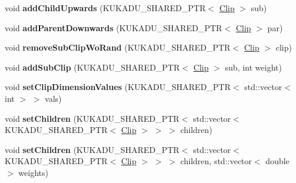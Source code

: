 \begin{DoxyCompactItemize}
\item 
void {\bfseries add\+Child\+Upwards} (K\+U\+K\+A\+D\+U\+\_\+\+S\+H\+A\+R\+E\+D\+\_\+\+P\+TR$<$ \hyperlink{classkukadu_1_1Clip}{Clip} $>$ sub)\hypertarget{classkukadu_1_1Clip_a5cd572f564c87baaef107e88f0097d57}{}\label{classkukadu_1_1Clip_a5cd572f564c87baaef107e88f0097d57}

\item 
void {\bfseries add\+Parent\+Downwards} (K\+U\+K\+A\+D\+U\+\_\+\+S\+H\+A\+R\+E\+D\+\_\+\+P\+TR$<$ \hyperlink{classkukadu_1_1Clip}{Clip} $>$ par)\hypertarget{classkukadu_1_1Clip_a6183ebd44f8c20e2b588e0d85c616c34}{}\label{classkukadu_1_1Clip_a6183ebd44f8c20e2b588e0d85c616c34}

\item 
void {\bfseries remove\+Sub\+Clip\+Wo\+Rand} (K\+U\+K\+A\+D\+U\+\_\+\+S\+H\+A\+R\+E\+D\+\_\+\+P\+TR$<$ \hyperlink{classkukadu_1_1Clip}{Clip} $>$ clip)\hypertarget{classkukadu_1_1Clip_afc489cc62a302b2a679374b4617e5a31}{}\label{classkukadu_1_1Clip_afc489cc62a302b2a679374b4617e5a31}

\item 
void {\bfseries add\+Sub\+Clip} (K\+U\+K\+A\+D\+U\+\_\+\+S\+H\+A\+R\+E\+D\+\_\+\+P\+TR$<$ \hyperlink{classkukadu_1_1Clip}{Clip} $>$ sub, int weight)\hypertarget{classkukadu_1_1Clip_a2247e017be36476075ce9ce68358e53d}{}\label{classkukadu_1_1Clip_a2247e017be36476075ce9ce68358e53d}

\item 
void {\bfseries set\+Clip\+Dimension\+Values} (K\+U\+K\+A\+D\+U\+\_\+\+S\+H\+A\+R\+E\+D\+\_\+\+P\+TR$<$ std\+::vector$<$ int $>$ $>$ vals)\hypertarget{classkukadu_1_1Clip_af56ce79b2094de5bcab46642bad5d817}{}\label{classkukadu_1_1Clip_af56ce79b2094de5bcab46642bad5d817}

\item 
void {\bfseries set\+Children} (K\+U\+K\+A\+D\+U\+\_\+\+S\+H\+A\+R\+E\+D\+\_\+\+P\+TR$<$ std\+::vector$<$ K\+U\+K\+A\+D\+U\+\_\+\+S\+H\+A\+R\+E\+D\+\_\+\+P\+TR$<$ \hyperlink{classkukadu_1_1Clip}{Clip} $>$ $>$ $>$ children)\hypertarget{classkukadu_1_1Clip_a088ed28a35cf7c00f4fff1fa62936cd0}{}\label{classkukadu_1_1Clip_a088ed28a35cf7c00f4fff1fa62936cd0}

\item 
void {\bfseries set\+Children} (K\+U\+K\+A\+D\+U\+\_\+\+S\+H\+A\+R\+E\+D\+\_\+\+P\+TR$<$ std\+::vector$<$ K\+U\+K\+A\+D\+U\+\_\+\+S\+H\+A\+R\+E\+D\+\_\+\+P\+TR$<$ \hyperlink{classkukadu_1_1Clip}{Clip} $>$ $>$ $>$ children, std\+::vector$<$ double $>$ weights)\hypertarget{classkukadu_1_1Clip_aaf2e88408e9b5d7001ca8563b8a1abdf}{}\label{classkukadu_1_1Clip_aaf2e88408e9b5d7001ca8563b8a1abdf}


\end{DoxyCompactItemize}
